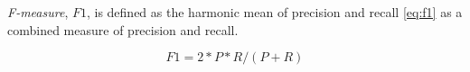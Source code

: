 \textit{F-measure}, $\mathit{F1}$, is defined as the harmonic mean of precision and recall \eqref{eq:f1} as a combined measure of precision and recall.

\begin{equation} \label{eq:f1}
    \mathit{F1} = 2 * P * R / (P + R)
\end{equation}



